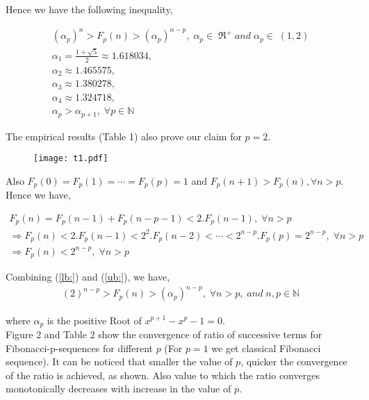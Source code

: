 \documentclass{ijcsa}
\begin{document}
Hence we have the following inequality,

\begin{eqnarray}
\label{lb:}
(\alpha_{p})^{n}>F_{p}(n)>(\alpha_{p})^{n-p}, \; \alpha_{p}\in\;\Re^{+}\; and\; \alpha_{p}\in\;(1,2) \\
\nonumber \alpha_{1}=\frac{1+\sqrt{5}}{2}\approx 1.618034, \\ 
\nonumber \alpha_{2} \approx 1.465575, \\
\nonumber \alpha_{3} \approx 1.380278, \\
\nonumber \alpha_{4} \approx 1.324718, \\
\nonumber \alpha_{p}>\alpha_{p+1},\;\forall{p}\in \mathbb{N} 
\end{eqnarray}
\par The empirical results (Table 1) also prove our claim for $p=2$. \\

\par
\begin{figure}[htbp]
	\label{fig:t1}
	\centering
		\texttt{[image: t1.pdf]}
\end{figure}

\par Also $F_{p}(0)=F_{p}(1)=\cdots=F_{p}(p)=1$ and $F_{p}(n+1)>F_{p}(n), \forall{n}>p$. Hence we have,

\begin{eqnarray}
\label{ub:}
\nonumber F_{p}(n)=F_{p}(n-1)+F_{p}(n-p-1)<2.F_{p}(n-1),\; \forall{n}>p  \\
\nonumber \Rightarrow F_{p}(n)<2.F_{p}(n-1)<2^{2}.F_{p}(n-2)<\cdots<2^{n-p}.F_{p}(p)=2^{n-p},\; \forall{n}>p  \\
\Rightarrow F_{p}(n) < 2^{n-p}, \; \forall{n}>p \;\;
\end{eqnarray}

\par Combining (\ref{lb:}) and (\ref{ub:}), we have,
\begin{eqnarray}
\label{bounds:}
(2)^{n-p} > F_{p}(n) > (\alpha_{p})^{n-p}, \; \forall{n}>p, \; and\; n,p \in \mathbb{N}
\end{eqnarray}
\par where $\alpha_{p}$ is the positive Root of $x^{p+1}-x^{p}-1=0$. \\

Figure 2 and Table 2 show the convergence of ratio of successive terms for Fibonacci-p-sequences for different $p$ (For $p=1$ we get classical Fibonacci sequence). It can be noticed that smaller the value of $p$, quicker the convergence of the ratio is achieved, as shown. Also value to which the ratio converges monotonically decreases with increase in the value of $p$.
\end{document}
